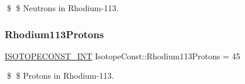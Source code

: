 \$ \$ Neutrons in Rhodium-\/113. \mbox{\label{group___isotope_const-_rhodium-_rh113_gad84a690c19fe0e2e0794fe6e07d57b5b}} 
\subsubsection{\texorpdfstring{Rhodium113\+Protons}{Rhodium113Protons}}
{\footnotesize\ttfamily \mbox{\hyperlink{group___isotope_const-_macros_ga5f18360b3e99483a35c32d789e62621c}{I\+S\+O\+T\+O\+P\+E\+C\+O\+N\+S\+T\+\_\+\+I\+NT}} Isotope\+Const\+::\+Rhodium113\+Protons = 45}

\$ \$ Protons in Rhodium-\/113. 